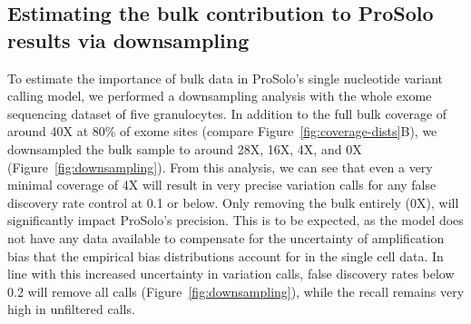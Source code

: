 \documentclass[authoryear,preprint,11pt]{scrartcl}
\begin{document}
\subsection{Estimating the bulk contribution to ProSolo results via downsampling} \label{sec:downsampling}

To estimate the importance of bulk data in ProSolo's single nucleotide variant calling model, we performed a downsampling analysis with the whole exome sequencing dataset of five granulocytes.
In addition to the full bulk coverage of around 40X at 80\% of exome sites (compare Figure~\ref{fig:coverage-dists}B), we downsampled the bulk sample to around 28X, 16X, 4X, and 0X (Figure~\ref{fig:downsampling}).
From this analysis, we can see that even a very minimal coverage of 4X will result in very precise variation calls for any false discovery rate control at 0.1 or below.
Only removing the bulk entirely (0X), will significantly impact ProSolo's precision.
This is to be expected, as the model does not have any data available to compensate for the uncertainty of amplification bias that the empirical bias distributions account for in the single cell data.
In line with this increased uncertainty in variation calls, false discovery rates below 0.2 will remove all calls (Figure~\ref{fig:downsampling}), while the recall remains very high in unfiltered calls.
\end{document}
